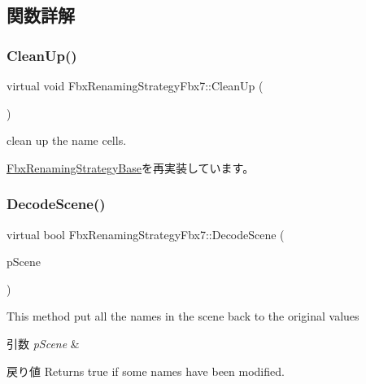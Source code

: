 \subsection{関数詳解}
\mbox{\label{class_fbx_renaming_strategy_fbx7_a4495cc04e089d7e0d432e50a3161ea50}} 
\subsubsection{\texorpdfstring{Clean\+Up()}{CleanUp()}}
{\footnotesize\ttfamily virtual void Fbx\+Renaming\+Strategy\+Fbx7\+::\+Clean\+Up (\begin{DoxyParamCaption}{ }\end{DoxyParamCaption})\hspace{0.3cm}{\ttfamily [virtual]}}



clean up the name cells. 



\hyperlink{class_fbx_renaming_strategy_base_ae1ab8784f6769fce3068ee21e3c34196}{Fbx\+Renaming\+Strategy\+Base}を再実装しています。

\mbox{\label{class_fbx_renaming_strategy_fbx7_a203a4659e427f4c6046eff93031a24bf}} 
\subsubsection{\texorpdfstring{Decode\+Scene()}{DecodeScene()}}
{\footnotesize\ttfamily virtual bool Fbx\+Renaming\+Strategy\+Fbx7\+::\+Decode\+Scene (\begin{DoxyParamCaption}\item[{\hyperlink{class_fbx_scene}{Fbx\+Scene} $\ast$}]{p\+Scene }\end{DoxyParamCaption})\hspace{0.3cm}{\ttfamily [virtual]}}

This method put all the names in the scene back to the original values 
\begin{DoxyParams}{引数}
{\em p\+Scene} & \\
\hline
\end{DoxyParams}
\begin{DoxyReturn}{戻り値}
Returns true if some names have been modified. 
\end{DoxyReturn}


